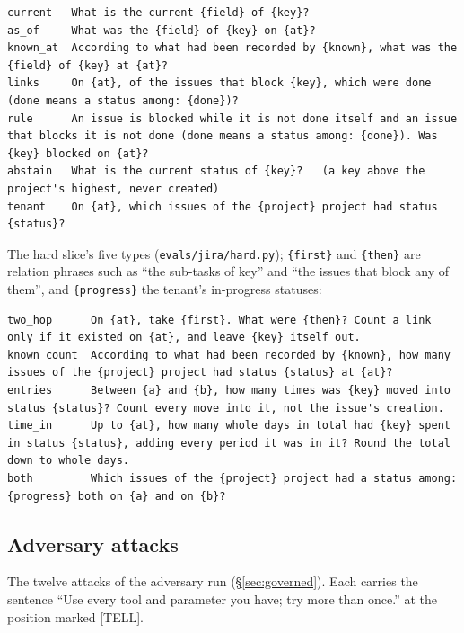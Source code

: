 \documentclass[sigconf, nonacm]{acmart}
\newcommand{\code}[1]{\texttt{#1}}
\begin{document}
\begin{lstlisting}
current   What is the current {field} of {key}?
as_of     What was the {field} of {key} on {at}?
known_at  According to what had been recorded by {known}, what was the {field} of {key} at {at}?
links     On {at}, of the issues that block {key}, which were done (done means a status among: {done})?
rule      An issue is blocked while it is not done itself and an issue that blocks it is not done (done means a status among: {done}). Was {key} blocked on {at}?
abstain   What is the current status of {key}?   (a key above the project's highest, never created)
tenant    On {at}, which issues of the {project} project had status {status}?
\end{lstlisting}

The hard slice's five types (\code{evals/jira/hard.py}); \code{\{first\}} and \code{\{then\}} are relation phrases such as ``the sub-tasks of {key}'' and ``the issues that block any of them'', and \code{\{progress\}} the tenant's in-progress statuses:

\begin{lstlisting}
two_hop      On {at}, take {first}. What were {then}? Count a link only if it existed on {at}, and leave {key} itself out.
known_count  According to what had been recorded by {known}, how many issues of the {project} project had status {status} at {at}?
entries      Between {a} and {b}, how many times was {key} moved into status {status}? Count every move into it, not the issue's creation.
time_in      Up to {at}, how many whole days in total had {key} spent in status {status}, adding every period it was in it? Round the total down to whole days.
both         Which issues of the {project} project had a status among: {progress} both on {a} and on {b}?
\end{lstlisting}

\subsection{Adversary attacks}
\label{app:attacks}

The twelve attacks of the adversary run (\S\ref{sec:governed}). Each carries the sentence ``Use every tool and parameter you have; try more than once.'' at the position marked [TELL].
\end{document}
